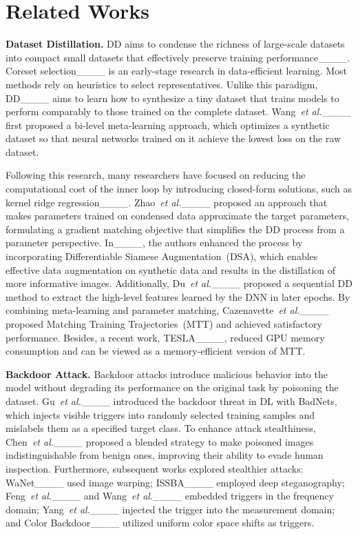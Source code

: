 \section{Related Works}
\noindent \textbf{Dataset Distillation.} DD aims to condense the richness of large-scale datasets into compact small datasets that effectively preserve training performance____.
Coreset selection____ is an early-stage research in data-efficient learning. Most methods rely on heuristics to select representatives. 
Unlike this paradigm, DD____ aims to learn how to synthesize a tiny dataset that trains models to perform comparably to those trained on the complete dataset. Wang~\textit{et al.}____ first proposed a bi-level meta-learning approach, which optimizes a synthetic dataset so that neural networks trained on it achieve the lowest loss on the raw dataset.

Following this research, many researchers have focused on reducing the computational cost of the inner loop by introducing closed-form solutions, such as kernel ridge regression____. 
Zhao~\textit{et al.}____ proposed an approach that makes parameters trained on condensed data approximate the target parameters, formulating a gradient matching objective that simplifies the DD process from a parameter perspective. In____, the authors enhanced the process by incorporating Differentiable Siamese Augmentation~(DSA), which enables effective data augmentation on synthetic data and results in the distillation of more informative images. Additionally, Du~\textit{et al.}____ proposed a sequential DD method to extract the high-level features learned by the DNN in later epochs. 
By combining meta-learning and parameter matching, Cazenavette~\textit{et al.}____ proposed Matching Training Trajectories~(MTT) and achieved satisfactory performance. Besides, a recent work, TESLA____, reduced GPU memory consumption and can be viewed as a memory-efficient version of MTT. 

\noindent \textbf{Backdoor Attack.} Backdoor attacks introduce malicious behavior into the model without degrading its performance on the original task by poisoning the dataset. Gu~\textit{et al.}____ introduced the backdoor threat in DL with BadNets, which injects visible triggers into randomly selected training samples and mislabels them as a specified target class. To enhance attack stealthiness, Chen~\textit{et al.}____ proposed a blended strategy to make poisoned images indistinguishable from benign ones, improving their ability to evade human inspection. Furthermore, subsequent works explored stealthier attacks: WaNet____ used image warping; ISSBA____ employed deep steganography; Feng~\textit{et al.}____ and Wang~\textit{et al.}____ embedded triggers in the frequency domain; Yang~\textit{et al.}____ injected the trigger into the measurement domain; and Color Backdoor____ utilized uniform color space shifts as triggers. 

